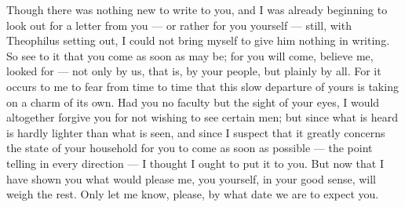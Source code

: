 

 Though there was nothing new to write to you, and I was already beginning to look out for a letter from you --- or rather for you yourself --- still, with Theophilus setting out, I could not bring myself to give him nothing in writing. So see to it that you come as soon as may be; for you will come, believe me, looked for --- not only by us, that is, by your people, but plainly by all. For it occurs to me to fear from time to time that this slow departure of yours is taking on a charm of its own. Had you no faculty but the sight of your eyes, I would altogether forgive you for not wishing to see certain men; but since what is heard is hardly lighter than what is seen, and since I suspect that it greatly concerns the state of your household for you to come as soon as possible --- the point telling in every direction --- I thought I ought to put it to you. But now that I have shown you what would please me, you yourself, in your good sense, will weigh the rest. Only let me know, please, by what date we are to expect you.
